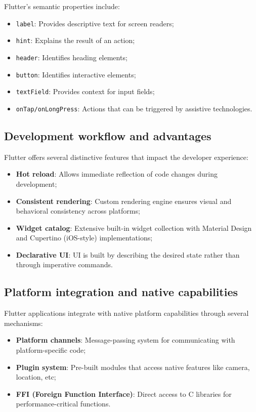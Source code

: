 Flutter's semantic properties include:

\begin{itemize}
    \item \texttt{label}: Provides descriptive text for screen readers;
    \item \texttt{hint}: Explains the result of an action;
    \item \texttt{header}: Identifies heading elements;
    \item \texttt{button}: Identifies interactive elements;
    \item \texttt{textField}: Provides context for input fields;
    \item \texttt{onTap/onLongPress}: Actions that can be triggered by assistive technologies.
\end{itemize}

\subsection{Development workflow and advantages}
Flutter offers several distinctive features that impact the developer experience:

\begin{itemize}
    \item \textbf{Hot reload}: Allows immediate reflection of code changes during development;
    \item \textbf{Consistent rendering}: Custom rendering engine ensures visual and behavioral consistency across platforms;
    \item \textbf{Widget catalog}: Extensive built-in widget collection with Material Design and Cupertino (iOS-style) implementations;
    \item \textbf{Declarative UI}: UI is built by describing the desired state rather than through imperative commands.
\end{itemize}

\subsection{Platform integration and native capabilities}
Flutter applications integrate with native platform capabilities through several mechanisms:

\begin{itemize}
    \item \textbf{Platform channels}: Message-passing system for communicating with platform-specific code;
    \item \textbf{Plugin system}: Pre-built modules that access native features like camera, location, etc;
    \item \textbf{FFI (Foreign Function Interface)}: Direct access to C libraries for performance-critical functions.
\end{itemize}


